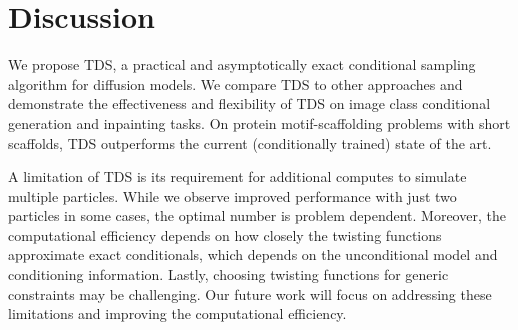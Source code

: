 \section{Discussion}\label{sec:discussion}
\ifnum {}
We propose TDS, a practical and asymptotically exact conditional sampling algorithm for diffusion models. 
We compare TDS to other approaches and demonstrate the effectiveness and flexibility of TDS on image class conditional generation and inpainting tasks. 
On protein motif-scaffolding problems with short scaffolds, TDS outperforms the current (conditionally trained) state of the art. 
\fi

A limitation of TDS is its requirement for  additional computes to simulate multiple particles.
While we observe improved performance with just two particles in some cases, the optimal number is problem dependent.
Moreover, the computational efficiency depends on how closely the twisting functions approximate exact conditionals,
which depends on the unconditional model and conditioning information.
Lastly, choosing twisting functions for generic constraints may be challenging.
Our future work will focus on addressing these limitations and improving the computational efficiency. 

